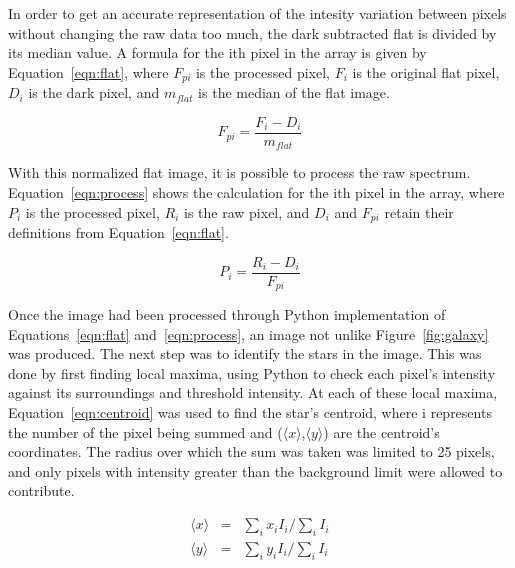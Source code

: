\documentclass[a4paper,12pt]{article}
\begin{document}
In order to get an accurate representation of the intesity variation between pixels without changing the raw data too much, the dark subtracted flat is divided by its median value. A formula for the ith pixel in the array is given by Equation~\ref{eqn:flat}, where $F_{pi}$ is the processed pixel, $F_{i}$ is the original flat pixel, $D_{i}$ is the dark pixel, and $m_{flat}$ is the median of the flat image.

\begin{equation}
F_{pi} = \frac{F_{i} - D_{i}}{m_{flat}}
\label{eqn:flat}
\end{equation}

With this normalized flat image, it is possible to process the raw spectrum. Equation~\ref{eqn:process} shows the calculation for the ith pixel in the array, where $P_{i}$ is the processed pixel, $R_{i}$ is the raw pixel, and $D_{i}$ and $F_{pi}$ retain their definitions from Equation~\ref{eqn:flat}.

\begin{equation}
P_{i} = \frac{R_{i} - D_{i}}{F_{pi}}
\label{eqn:process}
\end{equation}

Once the image had been processed through Python implementation of Equations~\ref{eqn:flat} and~\ref{eqn:process}, an image not unlike Figure~\ref{fig:galaxy} was produced. The next step was to identify the stars in the image. This was done by first finding local maxima, using Python to check each pixel's intensity against its surroundings and threshold intensity. At each of these local maxima, Equation~\ref{eqn:centroid} was used to find the star's centroid, where i represents the number of the pixel being summed and ($\langle x \rangle$,$\langle y \rangle$) are the centroid's coordinates. The radius over which the sum was taken was limited to 25 pixels, and only pixels with intensity greater than the background limit were allowed to contribute.

\begin{equation}
\begin{array}{ccl}
\langle x \rangle &=& \sum_{i}x_{i}I_{i}/\sum_{i}I_{i}\\
\langle y \rangle &=& \sum_{i}y_{i}I_{i}/\sum_{i}I_{i}
\end{array}
\label{eqn:centroid}
\end{equation}
\end{document}
